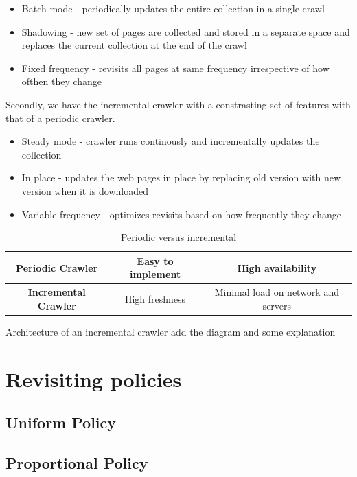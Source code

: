 \documentclass[a4paper, 11pt]{article} %
\begin{document}
\begin{itemize}
\item Batch mode - periodically updates the entire collection in a single crawl
\item Shadowing - new set of pages are collected and stored in a separate space and replaces the current collection at the end of the crawl
\item Fixed frequency - revisits all pages at same frequency irrespective of how ofthen they change
\end{itemize} 

Secondly, we have the incremental crawler with a constrasting set of features with that of a periodic crawler.

\begin{itemize}

\item Steady mode - crawler runs continously and incrementally updates the collection
\item In place - updates the web pages in place by replacing old version with new version when it is downloaded
\item Variable frequency - optimizes revisits based on how frequently they change 

\end{itemize}

\begin{table}
\begin{tabular}{|c|c|c|}
\hline 
\textbf{Periodic Crawler} & Easy to implement & High availability \\ 
\hline 
\textbf{Incremental Crawler }& High freshness & Minimal load on network and servers \\ 
\hline
\end{tabular} 
\caption{Periodic versus incremental} 
\end{table}

Architecture of an incremental crawler add the diagram and some explanation

\section{Revisiting policies}

\cite{cho2003effective}

\subsection{Uniform Policy}

\subsection{Proportional Policy}
\end{document}
